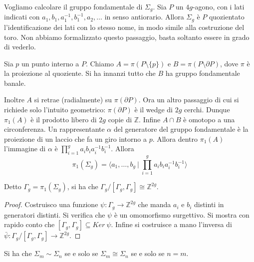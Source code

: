 \begin{ex}
    Vogliamo calcolare il gruppo fondamentale di $\Sigma_g$. Sia $P$ un $4g$-agono, con i lati indicati con $a_1, b_1, a_1^{-1}, b_1^{-1}, a_2, \dots$ in senso antiorario.
    Allora $\Sigma_g$ \`e $P$ quozientato l'identificazione dei lati con lo stesso nome, in modo simile alla costruzione del toro. Non abbiamo formalizzato questo passaggio, basta soltanto essere in grado di vederlo.

    Sia $p$ un punto interno a $P$. Chiamo $A = \pi(P\setminus\{p\})$ e $B=\pi(P\setminus\partial P)$, dove $\pi$ \`e la proiezione al quoziente.  Si ha innanzi tutto che $B$ ha gruppo fondamentale banale.

    Inoltre $A$ si retrae (radialmente) su $\pi(\partial P)$. Ora un altro passaggio di cui si richiede solo l'intuito geometrico: $\pi(\partial P)$ \`e il wedge di $2g$ cerchi. Dunque $\pi_1(A)$ \`e il prodotto libero di $2g$ copie di $\mathbb{Z}$. Infine $A\cap B$ \`e omotopo a una circonferenza. Un rappresentante $\alpha$ del generatore del gruppo fondamentale \`e la proiezione di un laccio che fa un giro intorno a $p$.
    Allora dentro $\pi_1(A)$ l'immagine di $\alpha$ \`e $\prod_{i=1}^g a_ib_ia_i^{-1}b_i^{-1}$.
    Allora
    \[
        \pi_1(\Sigma_g)=\langle a_1, \dots, b_g\ |\ \prod_{i=1}^ga_ib_ia_i^{-1}b_i^{-1}\rangle
    \]
\end{ex}
\begin{prop}
    Detto $\Gamma_g = \pi_1(\Sigma_g)$, si ha che $\Gamma_g /[\Gamma_g, \Gamma_g] \cong \mathbb{Z}^{2g}$.
\end{prop}
\begin{proof}
    Costruisco una funzione $\psi\colon \Gamma_g\longrightarrow \mathbb{Z}^{2g}$ che manda $a_i$ e $b_i$ distinti in generatori distinti. Si verifica che $\psi$ \`e un omomorfismo surgettivo. Si mostra con rapido conto che $[\Gamma_g, \Gamma_g]\subseteq Ker\ \psi$. Infine si costruisce a mano l'inversa di $\bar{\psi}\colon \Gamma_g /[\Gamma_g, \Gamma_g]\rightarrow \mathbb{Z}^{2g}$.
\end{proof}

\begin{cor}
    Si ha che $\Sigma_m \sim \Sigma_n$ se e solo se $\Sigma_m \cong \Sigma_n$ se e solo se $n=m$.
\end{cor}
